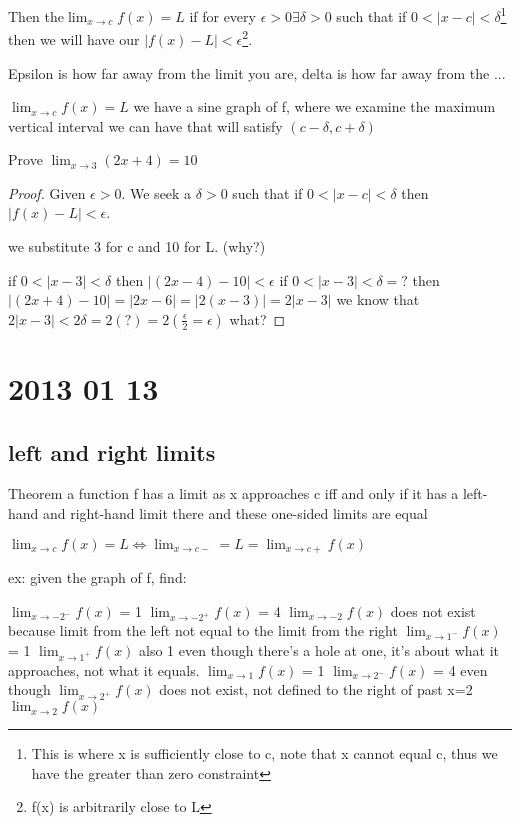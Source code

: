 \documentclass[12pt]{article}
\begin{document}
Then the$\lim_{x \to c} f(x) = L$ if for every $\epsilon > 0 \exists \delta > 0$ such that if $0 < |x-c| <
\delta{}$\footnote{This is where x is sufficiently close to c, note that x cannot equal c, thus we have the
  greater than zero constraint} then we will have our $|f(x)-L| < \epsilon $\footnote{f(x) is arbitrarily close to L}.

Epsilon is how far away from the limit you are, delta is how far away from the ...


$\lim_{x \to c}f(x) = L$ we have a sine graph of f, where we examine the maximum vertical interval we can have
that will satisfy $(c- \delta,c + \delta)$

Prove $\lim_{x \to 3}(2x +4) = 10$

\begin{proof}
Given $\epsilon > 0$. We seek a $\delta > 0$ such that if $0 < |x-c| < \delta$ then $|f(x)-L|< \epsilon$.

we substitute 3 for c and 10 for L. (why?)

if $0 < |x-3| < \delta$ then $|(2x-4)-10|< \epsilon$
if $0 < |x-3| < \delta = ?$ then $|(2x+4)-10| = |2x-6| = |2(x-3)| = 2|x-3| $
we know that $ 2|x-3| < 2 \delta = 2(?) = 2(\frac{\epsilon}{2} = \epsilon)$ what?
\end{proof}

\section{2013 01 13}
\subsection{left and right limits}
Theorem a function f has a limit as x approaches c iff and only if it has a left-hand and right-hand limit
there and these one-sided limits are equal

$\lim_{x \to c}f(x) = L \iff \lim_{x \to c -} = L = \lim_{x \to c +}f(x)$

ex: given the graph of f, find:

$\lim_{x \to -2^-}f(x)$ = 1
$\lim_{x \to -2^+}f(x)$ = 4
$\lim_{x \to -2}f(x)$ does not exist because limit from the left not equal to the limit from the right
$\lim_{x \to 1^-}f(x)$ = 1
$\lim_{x \to 1^+}f(x)$ also 1
even though there's a hole at one, it's about what it approaches, not what it equals.
$\lim_{x \to 1}f(x)$ = 1
$\lim_{x \to 2^-}f(x)$ = 4 even though
$\lim_{x \to 2^+}f(x)$ does not exist, not defined to the right of past x=2
$\lim_{x \to 2}f(x)$
\end{document}
